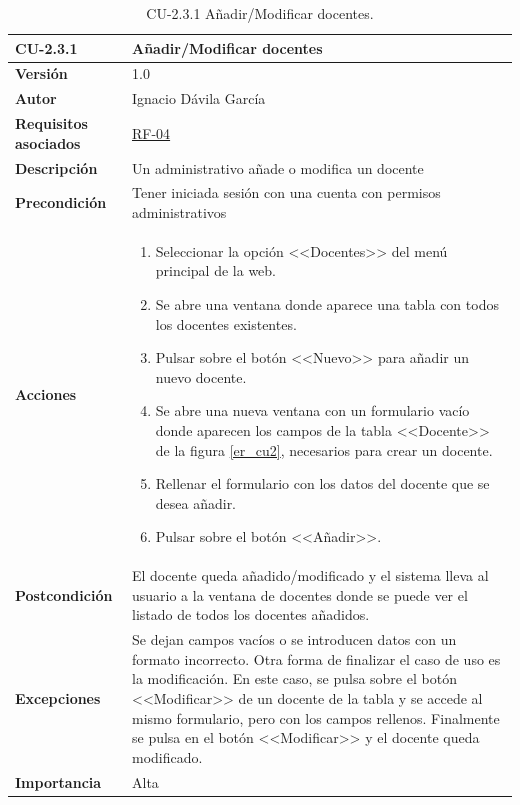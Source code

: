 \begin{table}[p]
\label{table:CU-2.3.1}
	\centering
	\begin{tabularx}{\linewidth}{ p{} p{} }
		\toprule
		\textbf{CU-2.3.1}    & \textbf{Añadir/Modificar docentes}\\
		\toprule
		\textbf{Versión}              & 1.0    \\
		\textbf{Autor}                & Ignacio Dávila García \\
		\textbf{Requisitos asociados} & \hyperref[itm:RF4]{RF-04} \\
		\textbf{Descripción}          & Un administrativo añade o modifica un docente \\
		\textbf{Precondición}         & Tener iniciada sesión con una cuenta con permisos administrativos \\
		\textbf{Acciones}             &
		\begin{enumerate}
			\def\labelenumi{\arabic{enumi}.}
			\tightlist
			\item Seleccionar la opción <<Docentes>> del menú principal de la web.
			\item Se abre una ventana donde aparece una tabla con todos los docentes existentes.
			\item Pulsar sobre el botón <<Nuevo>> para añadir un nuevo docente.
			\item Se abre una nueva ventana con un formulario vacío donde aparecen los campos de la tabla <<Docente>> de la figura \ref{er_cu2}, necesarios para crear un docente.
			\item Rellenar el formulario con los datos del docente que se desea añadir.
			\item Pulsar sobre el botón <<Añadir>>.
		\end{enumerate}\\
		\textbf{Postcondición}        & El docente queda añadido/modificado y el sistema lleva al usuario a la ventana de docentes donde se puede ver el listado de todos los docentes añadidos. \\
		\textbf{Excepciones}          & Se dejan campos vacíos o se introducen datos con un formato incorrecto. Otra forma de finalizar el caso de uso es la modificación. En este caso, se pulsa sobre el botón <<Modificar>> de un docente de la tabla y se accede al mismo formulario, pero con los campos rellenos. Finalmente se pulsa en el botón <<Modificar>> y el docente queda modificado. \\
		\textbf{Importancia}          & Alta \\
		\bottomrule
	\end{tabularx}
	\caption{CU-2.3.1 Añadir/Modificar docentes.}
\end{table}
\FloatBarrier

